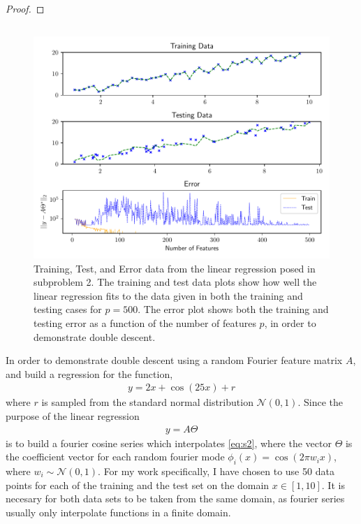 \documentclass{article}
\begin{document}
\begin{proof}
\end{proof}

\subsection{}

\begin{figure}[ht]
    \centering
    \includegraphics[width=\textwidth]{hw1s2.pdf}
    \caption{Training, Test, and Error data from the linear regression posed in
    subproblem 2. The training and test data plots show how well the linear
    regression fits to the data given in both the training and testing cases for
    $p=500$. The error plot shows both the training and testing error as a
    function of the number of features $p$, in order to demonstrate double
    descent.}
    \label{fig:s2}
\end{figure}

In order to demonstrate double descent using a random Fourier feature matrix
$A$, and build a regression for the function, 
\begin{gather}
    y = 2x + \cos(25x) + r
    \label{eq:s2}
\end{gather}
where $r$ is sampled from the standard normal distribution $\mathcal{N}(0,1)$.
Since the purpose of the linear regression 
\begin{gather*}
    y = A\Theta
\end{gather*}
is to build a fourier cosine series which interpolates \eqref{eq:s2}, where the
vector $\Theta$ is the coefficient vector for each random fourier mode
$\phi_i(x) = \cos(2\pi w_ix)$, where $w_i \sim \mathcal{N}(0,1)$. For my work
specifically, I have chosen to use 50 data points for each of the training and
the test set on the domain $x \in [1,10]$. It is necesary for both data sets to
be taken from the same domain, as fourier series usually only interpolate
functions in a finite domain. 
\end{document}
